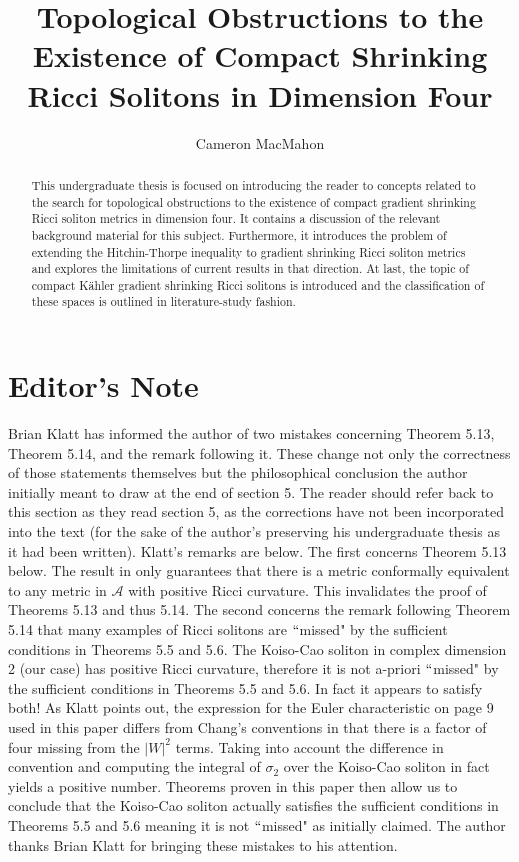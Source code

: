 \documentclass[openany, amssymb, psamsfonts]{amsart}
\title[Topological Obstructions] {Topological Obstructions to the Existence of Compact Shrinking Ricci Solitons in Dimension Four}
\author{Cameron MacMahon}
\theoremstyle{definition}
\numberwithin{equation}{section}
\begin{document}
\begin{abstract}

This undergraduate thesis is focused on introducing the reader to concepts related to the search for topological obstructions to the existence of compact gradient shrinking Ricci soliton metrics in dimension four. It contains a discussion of the relevant background material for this subject. Furthermore, it introduces the problem of extending the Hitchin-Thorpe inequality to gradient shrinking Ricci soliton metrics and explores the limitations of current results in that direction. At last, the topic of compact Kähler gradient shrinking Ricci solitons is introduced and the classification of these spaces is outlined in literature-study fashion. 

\end{abstract}

\maketitle

\tableofcontents

\section{Editor's Note}

Brian Klatt has informed the author of two mistakes concerning Theorem 5.13, Theorem 5.14, and the remark following it. These change not only the correctness of those statements themselves but the philosophical conclusion the author initially meant to draw at the end of section 5. The reader should refer back to this section as they read section 5, as the corrections have not been incorporated into the text (for the sake of the author's preserving his undergraduate thesis as it had been written). Klatt's remarks are below. The first concerns Theorem 5.13 below. The result in \cite{chang} only guarantees that there is a metric conformally equivalent to any metric in $\mathcal{A}$ with positive Ricci curvature. This invalidates the proof of Theorems 5.13 and thus 5.14. The second concerns the remark following Theorem 5.14 that many examples of Ricci solitons are $``$missed" by the sufficient conditions in Theorems 5.5 and 5.6. The Koiso-Cao soliton in complex dimension 2 (our case) has positive Ricci curvature, therefore it is not a-priori $``$missed" by the sufficient conditions in Theorems 5.5 and 5.6. In fact it appears to satisfy both! As Klatt points out, the expression for the Euler characteristic on page 9 used in this paper differs from Chang's \cite{chang} conventions in that there is a factor of four missing from the $|W|^2$ terms. Taking into account the difference in convention and computing the integral of $\sigma_2$ over the Koiso-Cao soliton in fact yields a positive number. Theorems proven in this paper then allow us to conclude that the Koiso-Cao soliton actually satisfies the sufficient conditions in Theorems 5.5 and 5.6 meaning it is not $``$missed" as initially claimed. The author thanks Brian Klatt for bringing these mistakes to his attention. 
\end{document}
